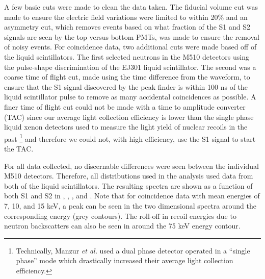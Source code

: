 A few basic cuts were made to clean the data taken.  The fiducial volume cut was made to ensure the electric field variations were limited to within 20\% and an asymmetry cut, which removes events based on what fraction of the S1 and S2 signals are seen by the top versus bottom PMTs, was made to ensure the removal of noisy events.  For coincidence data, two additional cuts were made based off of the liquid scintillators.  The first selected neutrons in the M510 detectors using the pulse-shape discrimination of the EJ301 liquid scintillator.  The second was a coarse time of flight cut, made using the time difference from the waveform, to ensure that the S1 signal discovered by the peak finder is within 100 ns of the liquid scintillator pulse to remove as many accidental coincidences as possible.  A finer time of flight cut could not be made with a time to amplitude converter (TAC) since our average light collection efficiency is lower than the single phase liquid xenon detectors used to measure the light yield of nuclear recoils in the past \cite{aprile2009new, manzur2010scintillation, plante2011new}\footnote{Technically,  Manzur \textit{et al.} used a dual phase detector operated in a ``single phase'' mode which drastically increased their average light collection efficiency.} and therefore we could not, with high efficiency, use the S1 signal to start the TAC.  %

For all data collected, no discernable differences were seen between the individual M510 detectors.  Therefore, all distributions used in the analysis used data from both of the liquid scintillators.  The resulting spectra are shown as a function of both S1 and S2 in , , , and .  Note that for coincidence data with mean energies of 7, 10, and 15 keV, a peak can be seen in the two dimensional spectra around the corresponding energy (grey contours).  The roll-off in recoil energies due to neutron backscatters can also be seen in  around the 75 keV energy contour.


